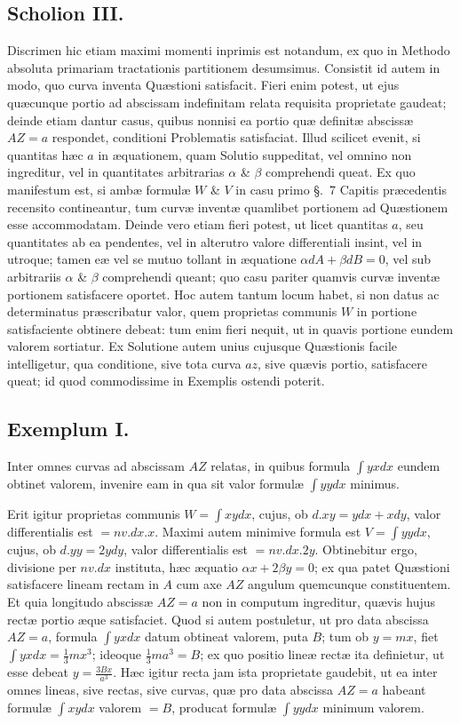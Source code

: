 \subsection*{Scholion III.}
Discrimen hic etiam maximi momenti inprimis est notandum, ex quo in Methodo absoluta primariam tractationis partitionem desumsimus. Consistit id autem in modo, quo curva inventa Quæstioni satisfacit. Fieri enim potest, ut ejus quæcunque portio ad abscissam indefinitam relata requisita proprietate gaudeat; deinde etiam dantur casus, quibus nonnisi ea portio quæ definitæ abscissæ $AZ=a$ respondet, conditioni Problematis satisfaciat. Illud scilicet evenit, si quantitas hæc $a$ in æquationem, quam Solutio suppeditat, vel omnino non ingreditur, vel in quantitates arbitrarias $\alpha$ \& $\beta$ comprehendi
queat. Ex quo manifestum est, si ambæ formulæ $W$ \& $V$ in casu primo §.~7 Capitis præcedentis recensito contineantur, tum curvæ inventæ quamlibet portionem ad Quæstionem esse accommodatam. Deinde vero etiam fieri potest, ut licet quantitas $a$, seu quantitates ab ea pendentes, vel in alterutro valore differentiali insint, vel in utroque; tamen eæ vel se mutuo tollant in æquatione $\alpha dA+\beta dB=0$, vel sub arbitrariis $\alpha$ \& $\beta$ comprehendi queant; quo casu pariter quamvis curvæ inventæ portionem satisfacere oportet. Hoc autem tantum locum habet, si non datus ac determinatus præscribatur valor, quem proprietas communis $W$ in portione satisfaciente obtinere debeat: tum enim fieri nequit, ut in quavis portione eundem valorem sortiatur. Ex Solutione autem unius cujusque Quæstionis facile intelligetur, qua conditione, sive tota curva $az$, sive quævis portio, satisfacere queat; id quod commodissime in Exemplis ostendi poterit.

\subsection*{Exemplum I.}
Inter omnes curvas ad abscissam $AZ$ relatas, in quibus formula $\int yxdx$ eundem obtinet valorem, invenire eam in qua sit valor formulæ $\int yydx$ minimus.

Erit igitur proprietas communis $W=\int xydx$, cujus, ob $d.xy=ydx+xdy$, valor differentialis est $=nv.dx.x$. Maximi autem minimive formula est $V=\int yydx$, cujus, ob $d.yy=2ydy$, valor differentialis est $=nv.dx.2y$. Obtinebitur ergo, divisione per $nv.dx$ instituta, hæc æquatio $\alpha x+2\beta y=0$; ex qua patet Quæstioni satisfacere lineam rectam in $A$ cum axe $AZ$ angulum quemcunque constituentem. Et quia longitudo abscissæ $AZ=a$ non in computum ingreditur, quævis hujus rectæ portio æque satisfaciet. Quod si autem postuletur, ut pro data abscissa $AZ=a$, formula $\int yxdx$ datum obtineat valorem, puta $B$; tum ob $y=mx$, fiet $\int yxdx=\frac13 mx^3$; ideoque $\frac13 ma^3=B$; ex quo positio lineæ rectæ
ita definietur, ut esse debeat $y=\frac{3Bx}{a^3}$. Hæc igitur recta jam ista proprietate gaudebit, ut ea inter omnes lineas, sive rectas, sive curvas, quæ pro data abscissa $AZ=a$ habeant formulæ $\int xydx$ valorem $=B$, producat formulæ $\int yydx$ minimum valorem.

